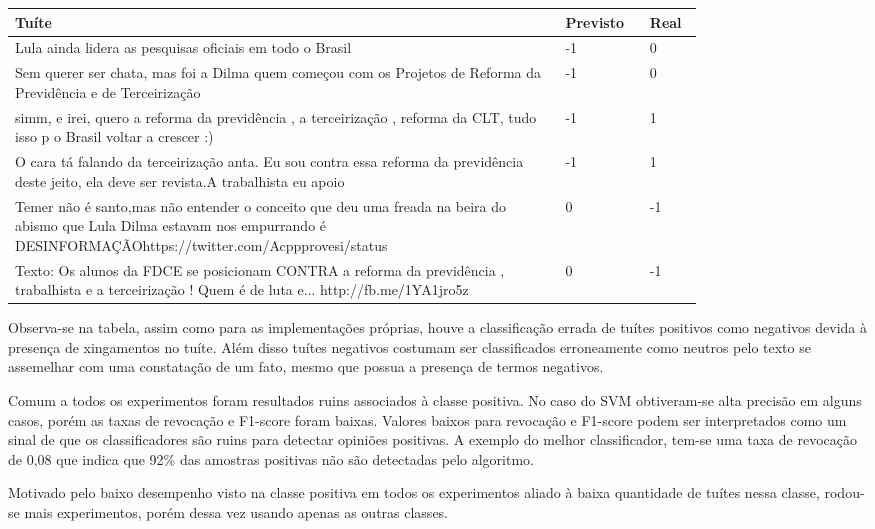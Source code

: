 \begin{table}[H]
	\centering
	\begin{tabular}{| p{0.8\linewidth} | l | l |}
		\hline
		Tuíte & Previsto & Real \\
		\hline
		Lula ainda lidera as pesquisas oficiais em todo o Brasil & -1 & 0 \\
		\hline
		Sem querer ser chata, mas foi a Dilma quem começou com os Projetos de Reforma da Previdência e de Terceirização & -1 & 0 \\
		\hline
		simm, e irei, quero a reforma da previdência , a terceirização , reforma da CLT, tudo isso p o Brasil voltar a crescer :) & -1 & 1 \\
		\hline
		O cara tá falando da terceirização anta. Eu sou contra essa reforma da previdência deste jeito, ela deve ser revista.A trabalhista eu apoio & -1 & 1 \\
		\hline
		Temer não é santo,mas não entender o conceito que deu uma freada na beira do abismo que Lula Dilma estavam nos empurrando é DESINFORMAÇÃOhttps://twitter.com/Acppprovesi/status & 0 & -1 \\
		\hline
		Texto: Os alunos da FDCE se posicionam CONTRA a reforma da previdência , trabalhista e a terceirização ! Quem é de luta e... http://fb.me/1YA1jro5z & 0 & -1 \\
		\hline
	\end{tabular}
\end{table}

Observa-se na tabela, assim como para as implementações próprias, houve a classificação errada
de tuítes positivos como negativos devida à presença de xingamentos no tuíte. Além disso tuítes
negativos costumam ser classificados erroneamente como neutros pelo texto se assemelhar com uma
constatação de um fato, mesmo que possua a presença de termos negativos.

Comum a todos os experimentos foram resultados ruins associados à classe positiva. No caso do SVM
obtiveram-se alta precisão em alguns casos, porém as taxas de revocação e F1-score foram baixas. Valores
baixos para revocação e F1-score podem ser interpretados como um sinal de que os classificadores
são ruins para detectar opiniões positivas. A exemplo do melhor classificador, tem-se uma taxa
de revocação de 0,08 que indica que 92\% das amostras positivas não são detectadas pelo algoritmo.

Motivado pelo baixo desempenho visto na classe positiva em todos os experimentos aliado à baixa
quantidade de tuítes nessa classe, rodou-se mais experimentos, porém dessa vez usando apenas as
outras classes.

